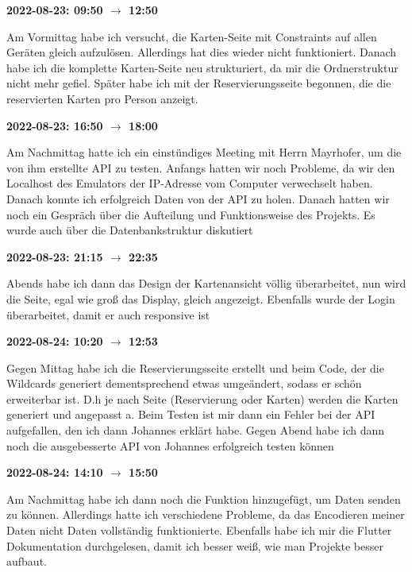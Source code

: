 \vspace{0.5cm} \textbf{2022-08-23: 09:50 $\rightarrow$ 12:50}

Am Vormittag habe ich versucht, die Karten-Seite mit Constraints auf allen
Ger\"aten gleich aufzulösen. Allerdings hat dies wieder nicht
funktioniert. Danach habe ich die komplette Karten-Seite neu strukturiert, da mir die Ordnerstruktur nicht mehr gefiel. Sp\"ater habe
ich mit der Reservierungsseite begonnen, die die reservierten Karten pro
Person anzeigt.

\vspace{0.5cm} \textbf{2022-08-23: 16:50 $\rightarrow$ 18:00}

Am Nachmittag hatte ich ein einstündiges Meeting mit Herrn Mayrhofer,
um die von ihm erstellte API zu testen. Anfangs hatten wir noch
Probleme, da wir den Localhost des Emulators der IP-Adresse vom
Computer verwechselt haben. Danach konnte ich erfolgreich Daten von der
API zu holen. Danach hatten wir noch ein Gespräch über die Aufteilung
und Funktionsweise des Projekts. Es wurde auch über die
Datenbankstruktur diskutiert

\vspace{0.5cm} \textbf{2022-08-23: 21:15 $\rightarrow$ 22:35}

Abends habe ich dann das Design der Kartenansicht völlig überarbeitet,
nun wird die Seite, egal wie groß das Display, gleich angezeigt.
Ebenfalls wurde der Login überarbeitet, damit er auch responsive ist

\vspace{0.5cm} \textbf{2022-08-24: 10:20 $\rightarrow$ 12:53}

Gegen Mittag habe ich die Reservierungsseite erstellt und beim Code, der
die Wildcards generiert dementsprechend etwas umgeändert, sodass er
schön erweiterbar ist. D.h je nach Seite (Reservierung oder Karten)
werden die Karten generiert und angepasst a. Beim Testen ist
mir dann ein Fehler bei der API aufgefallen, den ich dann Johannes
erklärt habe. Gegen Abend habe ich dann noch die ausgebesserte API von
Johannes erfolgreich testen können

\vspace{0.5cm} \textbf{2022-08-24: 14:10 $\rightarrow$ 15:50}

Am Nachmittag habe ich dann noch die Funktion hinzugefügt, um Daten
senden zu können. Allerdings hatte ich verschiedene Probleme, da das
Encodieren meiner Daten nicht Daten vollst\"andig funktionierte. Ebenfalls habe ich
mir die Flutter Dokumentation durchgelesen, damit ich besser weiß, wie man Projekte besser aufbaut.


